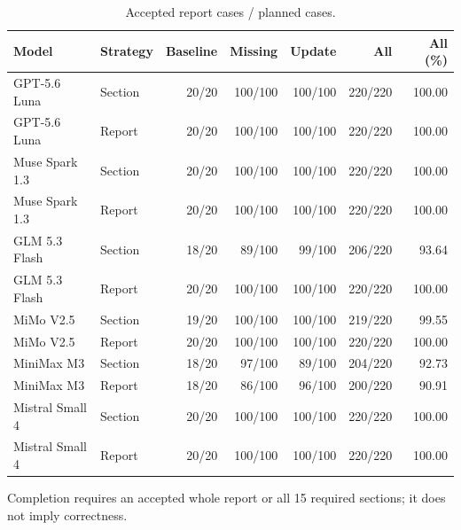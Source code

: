 \begin{table}[t]
\centering\small
\setlength{\tabcolsep}{4pt}
\caption{Accepted report cases / planned cases.}
\label{tab:supp-completion}
\begin{tabular}{llrrrrr}
\toprule
Model & Strategy & Baseline & Missing & Update & All & All (\%) \\
\midrule
GPT-5.6 Luna & Section & 20/20 & 100/100 & 100/100 & 220/220 & 100.00 \\
GPT-5.6 Luna & Report & 20/20 & 100/100 & 100/100 & 220/220 & 100.00 \\
Muse Spark 1.3 & Section & 20/20 & 100/100 & 100/100 & 220/220 & 100.00 \\
Muse Spark 1.3 & Report & 20/20 & 100/100 & 100/100 & 220/220 & 100.00 \\
GLM 5.3 Flash & Section & 18/20 & 89/100 & 99/100 & 206/220 & 93.64 \\
GLM 5.3 Flash & Report & 20/20 & 100/100 & 100/100 & 220/220 & 100.00 \\
MiMo V2.5 & Section & 19/20 & 100/100 & 100/100 & 219/220 & 99.55 \\
MiMo V2.5 & Report & 20/20 & 100/100 & 100/100 & 220/220 & 100.00 \\
MiniMax M3 & Section & 18/20 & 97/100 & 89/100 & 204/220 & 92.73 \\
MiniMax M3 & Report & 18/20 & 86/100 & 96/100 & 200/220 & 90.91 \\
Mistral Small 4 & Section & 20/20 & 100/100 & 100/100 & 220/220 & 100.00 \\
Mistral Small 4 & Report & 20/20 & 100/100 & 100/100 & 220/220 & 100.00 \\
\bottomrule
\end{tabular}
\par\vspace{3pt}
\begin{minipage}{0.98\linewidth}\footnotesize
Completion requires an accepted whole report or all 15 required sections; it does not imply correctness.
\end{minipage}
\end{table}

